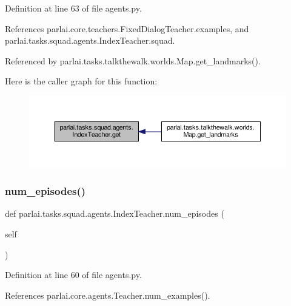 Definition at line 63 of file agents.\+py.



References parlai.\+core.\+teachers.\+Fixed\+Dialog\+Teacher.\+examples, and parlai.\+tasks.\+squad.\+agents.\+Index\+Teacher.\+squad.



Referenced by parlai.\+tasks.\+talkthewalk.\+worlds.\+Map.\+get\+\_\+landmarks().

Here is the caller graph for this function\+:
\nopagebreak
\begin{figure}[H]
\begin{center}
\leavevmode
\includegraphics[width=350pt]{classparlai_1_1tasks_1_1squad_1_1agents_1_1IndexTeacher_a44b2ee4a74283e8fe0a5b92749ed93d8_icgraph}
\end{center}
\end{figure}
\mbox{\label{classparlai_1_1tasks_1_1squad_1_1agents_1_1IndexTeacher_aeab5882318ba27f0ff15a0bc649fff0b}} 
\subsubsection{\texorpdfstring{num\+\_\+episodes()}{num\_episodes()}}
{\footnotesize\ttfamily def parlai.\+tasks.\+squad.\+agents.\+Index\+Teacher.\+num\+\_\+episodes (\begin{DoxyParamCaption}\item[{}]{self }\end{DoxyParamCaption})}



Definition at line 60 of file agents.\+py.



References parlai.\+core.\+agents.\+Teacher.\+num\+\_\+examples().



